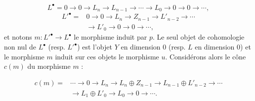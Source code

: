 \[
L^\bullet=0\longrightarrow0\longrightarrow L_n\longrightarrow L_{n-1}
\longrightarrow\cdots\longrightarrow L_0\longrightarrow0
\longrightarrow0\longrightarrow\cdots ,
\]
\[
\begin{aligned}
{L'}^\bullet={}&0\longrightarrow0\longrightarrow L_n
\longrightarrow Z_{n-1}\longrightarrow L'_{n-2}
\longrightarrow\cdots\\
&\longrightarrow L'_0\longrightarrow0\longrightarrow0
\longrightarrow\cdots ,
\end{aligned}
\]
et notons $m\colon {L'}^\bullet\longrightarrow L^\bullet$ le morphisme
induit par $p$. Le seul objet de cohomologie non nul de $L^\bullet$ (resp.
${L'}^\bullet$) est l'objet $Y$ en dimension $0$ (resp. $L$ en dimension
$0$) et le morphisme $m$ induit sur ces objets le morphisme $u$.
Considérons alors le cône $c(m)$ du morphisme $m$ :

\[
\begin{aligned}
c(m)={}&\cdots\longrightarrow0\longrightarrow L_n
\longrightarrow L_n\oplus Z_{n-1}
\longrightarrow L_{n-1}\oplus L'_{n-2}\longrightarrow\cdots\\
&\longrightarrow L_1\oplus L'_0\longrightarrow L_0
\longrightarrow0\longrightarrow\cdots.
\end{aligned}
\]
\endgroup
